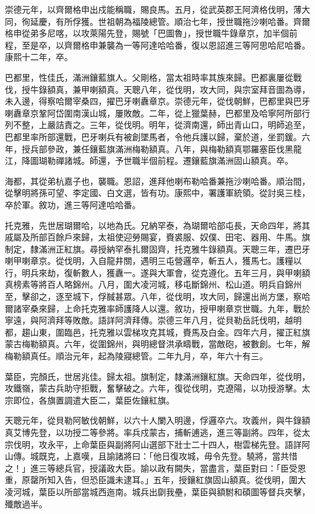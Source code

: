 \begin{pinyinscope}
崇德元年，以齊爾格申出戍能稱職，賜良馬。五月，從武英郡王阿濟格伐明，薄大同，徇延慶，有所俘獲。世祖朝為福陵總管。順治七年，授世職拖沙喇哈番。齊爾格申從弟多尼喀，以攻萊陽先登，賜號「巴圖魯」，授世職牛錄章京，加半個前程，至是卒，以齊爾格申兼襲為一等阿達哈哈番，復以恩詔進三等阿思哈尼哈番。康熙十二年，卒。

巴都里，性佳氏，滿洲鑲藍旗人。父剛格，當太祖時率其族來歸。巴都裏屢從戰伐，授牛錄額真，兼甲喇額真。天聰八年，從伐明，攻大同，與宗室拜音圖為導，未入邊，得察哈爾宰桑四，擢巴牙喇纛章京。崇德元年，從伐朝鮮，巴都里與巴牙喇纛章京鞏阿岱圍南漢山城，屢敗敵。二年，從上獵葉赫，巴都里及哈寧阿所部行列不整，上嚴詰責之。三年，從伐明。明年，從濟南還，師出青山口，明師追至，巴都里率所部還戰，巴牙喇兵有被創墜馬者，令他兵護以歸，棄於道，坐罰鍰。六年，授兵部參政，兼任鑲藍旗滿洲梅勒額真。八年，與梅勒額真鄂羅塞臣伐黑龍江，降圖瑚勒禪諸城。師還，予世職半個前程。遷鑲藍旗滿洲固山額真。卒。

海都，其從弟杭嘉子也，襲職。恩詔，進拜他喇布勒哈番兼拖沙喇哈番。順治間，從擊明將孫可望、李定國、白文選，皆有功。康熙中，署護軍統領。從討吳三桂，卒於軍。敘功，進三等阿達哈哈番。

托克雅，先世居瑚爾哈，以地為氏。兄納罕泰，為瑚爾哈部屯長，天命四年，將其戚屬及所部百餘戶來歸，太祖使迎勞賜宴，賚裘服、奴僕、田宅、器用、牛馬。旗制定，隸滿洲正紅旗。尋授納罕泰扎爾固齊，托克雅牛錄額真。天聰三年，遷巴牙喇甲喇章京。從伐明，入自龍井關，遇明三屯營邏卒，斬五人，獲馬七。護糧以行，明兵來劫，復斬數人，獲纛一。遂與大軍會，從克遵化。五年三月，與甲喇額真榜素等將百人略錦州。八月，圍大凌河城，移屯斷錦州、松山道。明兵自錦州至，擊卻之，逐至城下，俘馘甚眾。八年，從伐明，攻大同，歸還出尚方堡，察哈爾諸宰桑來歸，上命托克雅率師護降人以還。敘功，授甲喇章京世職。九年，戰於寧遠，與阿濟拜等敗敵。語詳阿濟拜傳。崇德三年八月，從貝勒岳託伐明，越明都，趨山東，圍臨邑，托克雅以雲梯攻克其城，賚馬及白金。四年六月，擢正紅旗蒙古梅勒額真。六年，從圍錦州，與明總督洪承疇戰，當敵砲，被數創。七年，解梅勒額真任。順治元年，起為陵寢總管。二年九月，卒，年六十有三。

葉臣，完顏氏，世居兆佳。歸太祖。旗制定，隸滿洲鑲紅旗。天命四年，從伐明，攻鐵嶺，蒙古兵助守拒戰，奮擊破之。六年，復從伐明，克遼陽，以功授游擊。太宗即位，各旗置調遣大臣二，葉臣佐鑲紅旗。

天聰元年，從貝勒阿敏伐朝鮮，以六十人闌入明邊，俘邏卒六。攻義州，與牛錄額真艾博先登，以功授二等參將。率兵戍蒙古，捕斬逋逃，進三等副將。四年，從太宗伐明，攻永平，上命葉臣與副將阿山選部下壯士二十四人，樹雲梯先登。語詳阿山傳。城既克，上嘉嘆，且諭諸將曰：「他日復攻城，毋令先登。驍將，當共惜之！」進三等總兵官，授議政大臣。諭以政有闕失，當盡言，葉臣對曰：「臣受恩重，原罄所知入告，但恐臣識未逮耳。」五年，授鑲紅旗固山額真。從伐明，圍大凌河城，葉臣以所部當城西迤南。城兵出劘我壘，葉臣與額駙和碩圖等督兵夾擊，殲敵過半。


\end{pinyinscope}
